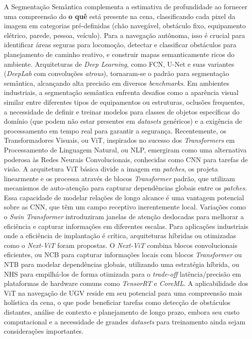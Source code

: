 A Segmentação Semântica complementa a estimativa de profundidade ao fornecer uma compreensão do \textbf{o quê} está presente na cena, classificando cada pixel da imagem em categorias pré-definidas (chão navegável, obstáculo fixo, equipamento elétrico, parede, pessoa, veículo). Para a navegação autônoma, isso é crucial para identificar áreas seguras para locomoção, detectar e classificar obstáculos para planejamento de caminho reativo, e construir mapas semanticamente ricos do ambiente. Arquiteturas de \textit{Deep Learning}, como \ac{FCN}, U-Net e suas variantes (\textit{DeepLab} com convoluções \textit{atrous}), tornaram-se o padrão para segmentação semântica, alcançando alta precisão em diversos \textit{benchmarks}. Em ambientes industriais, a segmentação semântica enfrenta desafios como a aparência visual similar entre diferentes tipos de equipamentos ou estruturas, oclusões frequentes, a necessidade de definir e treinar modelos para classes de objetos específicas do domínio (que podem não estar presentes em \textit{datasets} genéricos) e a exigência de processamento em tempo real para garantir a segurança.
Recentemente, os Transformadores Visuais, ou \ac{ViT}, inspirados no sucesso dos \textit{Transformers} em Processamento de Linguagem Natural, ou \ac{NLP}, emergiram como uma alternativa poderosa às Redes Neurais Convolucionais, conhecidas como \ac{CNN} para tarefas de visão. A arquitetura \ac{ViT} básica divide a imagem em \textit{patches}, os projeta linearmente e os processa através de blocos \textit{Transformer} padrão, que utilizam mecanismos de auto-atenção para capturar dependências globais entre os \textit{patches}. Essa capacidade de modelar relações de longo alcance é uma vantagem potencial sobre as \ac{CNN}, que têm um campo receptivo inerentemente local. Variações como o \textit{Swin Transformer} introduziram janelas de atenção deslocadas para melhorar a eficiência e capturar informações em diferentes escalas. Para aplicações industriais onde a eficiência de implantação é crítica, arquiteturas híbridas ou otimizadas como o \textit{Next-ViT} foram propostas. O \textit{Next-ViT} combina blocos convolucionais eficientes, ou \ac{NCB} para capturar informações locais com blocos \textit{Transformer} ou \ac{NTB} para modelar dependências globais, utilizando uma estratégia híbrida, ou \ac{NHS} para empilhá-los de forma otimizada para o \textit{trade-off} latência/precisão em plataformas de hardware comuns como \textit{TensorRT} e \textit{CoreML}. A aplicabilidade dos \ac{ViT} na navegação de \ac{UGV} reside em seu potencial para uma compreensão mais holística da cena, o que pode beneficiar tarefas como detecção de obstáculos distantes, análise de contexto e planejamento de longo prazo, embora seu custo computacional e a necessidade de grandes \textit{datasets} para treinamento ainda sejam considerações importantes.
